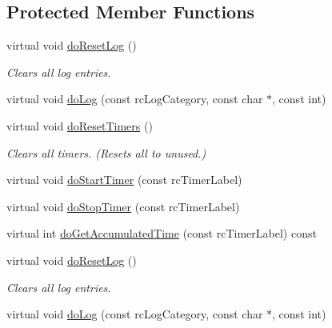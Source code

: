 \subsection*{Protected Member Functions}
\begin{DoxyCompactItemize}
\item 
\mbox{\label{classrcContext_aeb0a62bc037adef651cddcaaddc2c464}} 
virtual void \hyperlink{classrcContext_aeb0a62bc037adef651cddcaaddc2c464}{do\+Reset\+Log} ()
\begin{DoxyCompactList}\small\item\em Clears all log entries. \end{DoxyCompactList}\item 
virtual void \hyperlink{classrcContext_acdc23d6ffab2e0f2be874de17a94c159}{do\+Log} (const rc\+Log\+Category, const char $\ast$, const int)
\item 
\mbox{\label{classrcContext_a57a97f408dac1438d6eae0993fa68570}} 
virtual void \hyperlink{classrcContext_a57a97f408dac1438d6eae0993fa68570}{do\+Reset\+Timers} ()
\begin{DoxyCompactList}\small\item\em Clears all timers. (Resets all to unused.) \end{DoxyCompactList}\item 
virtual void \hyperlink{classrcContext_a9bf9c573becd7256d2b5cfafdd789cb5}{do\+Start\+Timer} (const rc\+Timer\+Label)
\item 
virtual void \hyperlink{classrcContext_a84e11ac2367269561b33bd76ab0d0fa4}{do\+Stop\+Timer} (const rc\+Timer\+Label)
\item 
virtual int \hyperlink{classrcContext_aac5af865c567bd0e362cb6a98c65c860}{do\+Get\+Accumulated\+Time} (const rc\+Timer\+Label) const
\item 
\mbox{\label{classrcContext_aeb0a62bc037adef651cddcaaddc2c464}} 
virtual void \hyperlink{classrcContext_aeb0a62bc037adef651cddcaaddc2c464}{do\+Reset\+Log} ()
\begin{DoxyCompactList}\small\item\em Clears all log entries. \end{DoxyCompactList}\item 
virtual void \hyperlink{classrcContext_acdc23d6ffab2e0f2be874de17a94c159}{do\+Log} (const rc\+Log\+Category, const char $\ast$, const int)
\item 

\end{DoxyCompactItemize}
